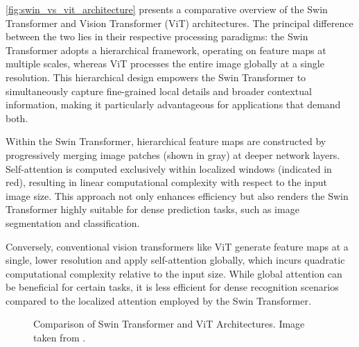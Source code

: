 \autoref{fig:swin_vs_vit_architecture} presents a comparative overview of the Swin Transformer and Vision Transformer (ViT) architectures. The principal difference between the two lies in their respective processing paradigms: the Swin Transformer adopts a hierarchical framework, operating on feature maps at multiple scales, whereas ViT processes the entire image globally at a single resolution. This hierarchical design empowers the Swin Transformer to simultaneously capture fine-grained local details and broader contextual information, making it particularly advantageous for applications that demand both.

Within the Swin Transformer, hierarchical feature maps are constructed by progressively merging image patches (shown in gray) at deeper network layers. Self-attention is computed exclusively within localized windows (indicated in red), resulting in linear computational complexity with respect to the input image size. This approach not only enhances efficiency but also renders the Swin Transformer highly suitable for dense prediction tasks, such as image segmentation and classification.

Conversely, conventional vision transformers like ViT generate feature maps at a single, lower resolution and apply self-attention globally, which incurs quadratic computational complexity relative to the input size. While global attention can be beneficial for certain tasks, it is less efficient for dense recognition scenarios compared to the localized attention employed by the Swin Transformer.

\begin{figure}[htbp]
    \centering
    \caption{Comparison of Swin Transformer \cite{transformer_swin} and ViT \cite{transformer_vit} Architectures. Image taken from \cite{transformer_swin}.}
    \label{fig:swin_vs_vit_architecture}
\end{figure}

